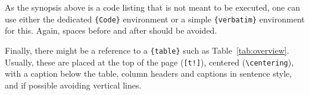 \documentclass[article]{jss}
\begin{document}
\begin{leftbar}
As the synopsis above is a code listing that is not meant to be executed,
one can use either the dedicated \verb|{Code}| environment or a simple
\verb|{verbatim}| environment for this. Again, spaces before and after should be
avoided.

Finally, there might be a reference to a \verb|{table}| such as
Table~\ref{tab:overview}. Usually, these are placed at the top of the page
(\verb|[t!]|), centered (\verb|\centering|), with a caption below the table,
column headers and captions in sentence style, and if possible avoiding vertical
lines.
\end{leftbar}

% 












































\end{document}
